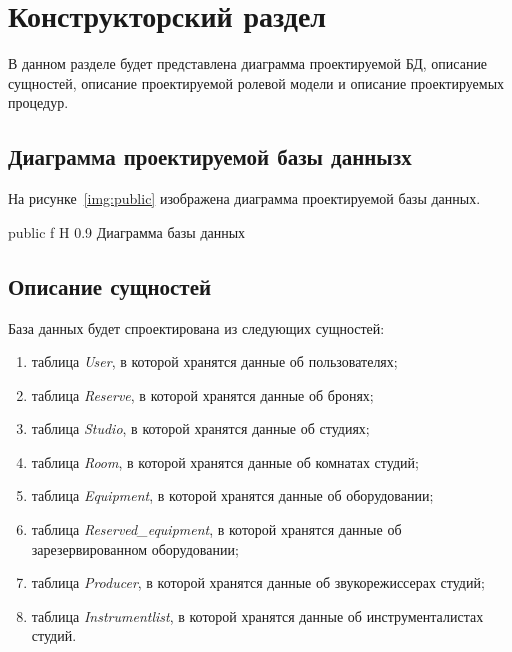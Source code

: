 \chapter{Конструкторский раздел}

В данном разделе будет представлена диаграмма проектируемой БД, описание сущностей, описание проектируемой ролевой модели и описание проектируемых процедур.

\section{Диаграмма проектируемой базы даннызх}
На рисунке~\ref{img:public} изображена диаграмма проектируемой базы данных.


{public} %
{f} %
{H} %
{0.9\textwidth} %
{Диаграмма базы данных} %


\section{Описание сущностей}
База данных будет спроектирована из следующих сущностей:
\begin{enumerate}
	\item таблица \textit{User}, в которой хранятся данные об пользователях;
	\item таблица \textit{Reserve}, в которой хранятся данные об бронях;
	\item таблица \textit{Studio}, в которой хранятся данные об студиях;
	\item таблица \textit{Room}, в которой хранятся данные об комнатах студий;
	\item таблица \textit{Equipment}, в которой хранятся данные об оборудовании;
	\item таблица \textit{Reserved\_equipment}, в которой хранятся данные об зарезервированном оборудовании;
	\item таблица \textit{Producer}, в которой хранятся данные об звукорежиссерах студий;
	\item таблица \textit{Instrumentlist}, в которой хранятся данные об инструменталистах студий.
\end{enumerate}
